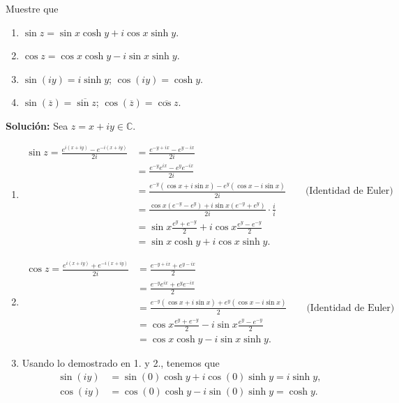 \begin{ejemplo}\label{PropiedadesTrigo}
Muestre que 

\begin{enumerate}
\item $\sin z = \sin x \cosh y + i \cos x \sinh y$.

\item $\cos z = \cos x \cosh y - i \sin x \sinh y$.

\item $\sin(iy) = i \sinh y$; $\cos(iy) = \cosh y$. 

\item $\sin(\overline{z}) = \overline{\sin z}$; $\cos(\overline{z}) = \overline{\cos z}$.
\end{enumerate}

\textbf{Solución:} Sea $z = x + iy \in \mathbb{C}$.

\begin{enumerate}
\item 
\begin{align*}
\sin z =\frac{e^{i(x+iy)} - e^{-i(x+iy)}}{2i} &= \frac{e^{-y + ix} - e^{y - ix}}{2i} \\
&= \frac{e^{-y} e^{ix} - e^{y} e^{-ix}}{2i} \\
&= \frac{e^{-y}(\cos x + i \sin x) - e^y (\cos x - i \sin x)}{2i} \qquad \mbox{(Identidad de Euler)}\\
&= \frac{\cos x (e^{-y} - e^y) + i \sin x (e^{-y} + e^y)}{2i} \cdot \frac{i}{i} \\
&= \sin x \frac{e^y + e^{-y}}{2} + i \cos x \frac{e^y-e^{-y}}{2} \\
&= \sin x \cosh y + i \cos x \sinh y.
\end{align*}

\item 
\begin{align*}
\cos z =\frac{e^{i(x+iy)} + e^{-i(x+iy)}}{2i} &= \frac{e^{-y + ix} + e^{y - ix}}{2} \\
&= \frac{e^{-y} e^{ix} + e^{y} e^{-ix}}{2} \\
&= \frac{e^{-y}(\cos x + i \sin x) + e^y (\cos x - i \sin x)}{2} \qquad \mbox{(Identidad de Euler)}\\
&= \cos x \frac{e^y + e^{-y}}{2} - i \sin x \frac{e^y-e^{-y}}{2} \\
&= \cos x \cosh y - i \sin x \sinh y.
\end{align*}

\item Usando lo demostrado en 1. y 2., tenemos que
\begin{align*}
\sin(iy) &= \sin(0) \cosh y + i \cos(0) \sinh y = i \sinh y, \\
\cos(iy) &= \cos(0) \cosh y - i \sin (0) \sinh y = \cosh y.
\end{align*}


\end{enumerate}
\end{ejemplo}
